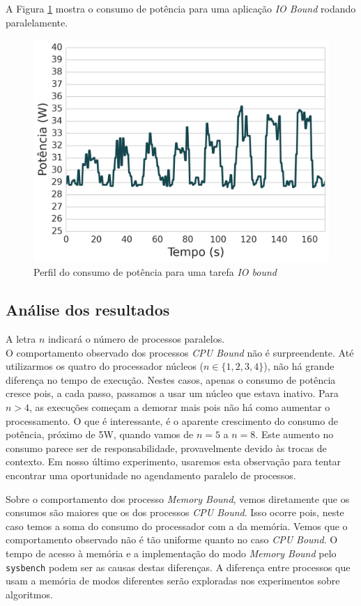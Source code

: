 A Figura \ref{perf_pot_io_bound_png} mostra o consumo de potência para uma aplicação \emph{IO Bound} rodando paralelamente.
\begin{figure}[htp]
\centering
\includegraphics[scale=0.70]{figuras/Exper/PerfPot/iobound.png}
\caption{Perfil do consumo de potência para uma tarefa \emph{IO bound}}
\label{perf_pot_io_bound_png}
\end{figure}


\subsection{Análise dos resultados}

A letra $ n $ indicará o número de processos paralelos.\\

O comportamento observado dos processos \emph{CPU Bound} não é surpreendente. Até utilizarmos os quatro do processador núcleos ($ n \in \{1, 2, 3,4 \} $), não há grande diferença no tempo de execução. Nestes casos, apenas o consumo de potência cresce pois, a cada passo, passamos a usar um núcleo que estava inativo. Para $ n > 4 $, as execuções começam a demorar mais pois não há como aumentar o processamento. O que é interessante, é o aparente crescimento do consumo de potência, próximo de 5W, quando vamos de $ n = 5 $ a $ n = 8$. Este aumento no consumo parece ser de responsabilidade, provavelmente devido às trocas de contexto. Em nosso último experimento, usaremos esta observação para tentar encontrar uma oportunidade no agendamento paralelo de processos.

Sobre o comportamento dos processo \emph{Memory Bound}, vemos diretamente que os consumos são maiores que os dos processos \emph{CPU Bound}. Isso ocorre pois, neste caso temos a soma do consumo do processador com a da memória. Vemos que o comportamento observado não é tão uniforme quanto no caso \emph{CPU Bound}. O tempo de acesso à memória e a implementação do modo \emph{Memory Bound} pelo \texttt{sysbench} podem ser as causas destas diferenças. A diferença entre processos que usam a memória de modos diferentes serão exploradas nos experimentos sobre algoritmos.

